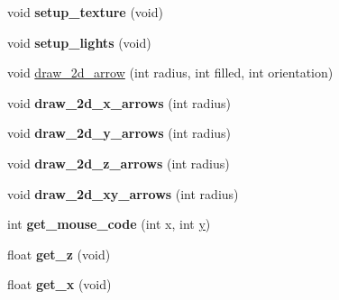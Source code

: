 \begin{DoxyCompactItemize}
\item 
\hypertarget{class_g_l_u_i___translation_a1ad1f0412c0c4668701dee4dc03ef07f}{void {\bfseries setup\+\_\+texture} (void)}\label{class_g_l_u_i___translation_a1ad1f0412c0c4668701dee4dc03ef07f}

\item 
\hypertarget{class_g_l_u_i___translation_a4f8bc171843cccb40d645f7eb955f4af}{void {\bfseries setup\+\_\+lights} (void)}\label{class_g_l_u_i___translation_a4f8bc171843cccb40d645f7eb955f4af}

\item 
void \hyperlink{class_g_l_u_i___translation_afc0c9da0f9ef84a04bbe11948e154a5c}{draw\+\_\+2d\+\_\+arrow} (int radius, int filled, int orientation)
\item 
\hypertarget{class_g_l_u_i___translation_af7263c8185a6a5320a74310e1f4856b6}{void {\bfseries draw\+\_\+2d\+\_\+x\+\_\+arrows} (int radius)}\label{class_g_l_u_i___translation_af7263c8185a6a5320a74310e1f4856b6}

\item 
\hypertarget{class_g_l_u_i___translation_a1ce40628f56baf117cd9c616efaeff6e}{void {\bfseries draw\+\_\+2d\+\_\+y\+\_\+arrows} (int radius)}\label{class_g_l_u_i___translation_a1ce40628f56baf117cd9c616efaeff6e}

\item 
\hypertarget{class_g_l_u_i___translation_aa639401a16c5160b758ab8a5ccfd4a3d}{void {\bfseries draw\+\_\+2d\+\_\+z\+\_\+arrows} (int radius)}\label{class_g_l_u_i___translation_aa639401a16c5160b758ab8a5ccfd4a3d}

\item 
\hypertarget{class_g_l_u_i___translation_a6e9b8fcb46e704c0131b42b3ef56165c}{void {\bfseries draw\+\_\+2d\+\_\+xy\+\_\+arrows} (int radius)}\label{class_g_l_u_i___translation_a6e9b8fcb46e704c0131b42b3ef56165c}

\item 
\hypertarget{class_g_l_u_i___translation_a6f1d169e372f206c7d9299d75b0508bf}{int {\bfseries get\+\_\+mouse\+\_\+code} (int x, int \hyperlink{_ice_utils_8h_aa7ffaed69623192258fb8679569ff9ba}{y})}\label{class_g_l_u_i___translation_a6f1d169e372f206c7d9299d75b0508bf}

\item 
\hypertarget{class_g_l_u_i___translation_a0c2156978610e8012928e3bb906d8352}{float {\bfseries get\+\_\+z} (void)}\label{class_g_l_u_i___translation_a0c2156978610e8012928e3bb906d8352}

\item 
\hypertarget{class_g_l_u_i___translation_ac3c6c8da177d6cb841c65a8f1ae33ebc}{float {\bfseries get\+\_\+x} (void)}\label{class_g_l_u_i___translation_ac3c6c8da177d6cb841c65a8f1ae33ebc}


\end{DoxyCompactItemize}
